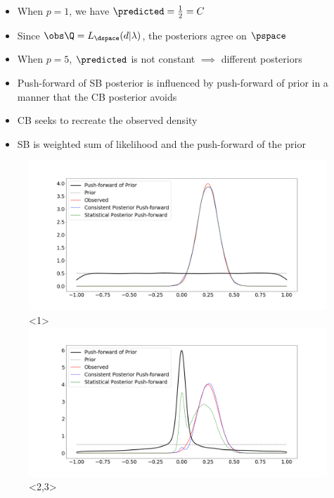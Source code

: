 
\begin{frame}[t]

\begin{itemize}
	\item <1,3> When $p=1$, we have $\predicted = \frac{1}{2} = C$
	\item <1> Since $\obs\Q = L_\dspace(d|\lambda)$, the posteriors agree on $\pspace$
	\item <2,3> When $p=5$, $\predicted$ is not constant $\implies$ different posteriors
	\item <2> Push-forward of SB posterior is influenced by push-forward of prior in a manner that the CB posterior avoids
	\item <3> CB seeks to recreate the observed density
	\item <3> SB is weighted sum of likelihood and the push-forward of the prior
\end{itemize}

\begin{figure}\label{fig:comparison}
		\includegraphics[width=.8\linewidth]{../images/comparison1.png}<1>
		\includegraphics[width=.8\linewidth]{../images/comparison5.png}<2,3>
\end{figure}

\end{frame}

